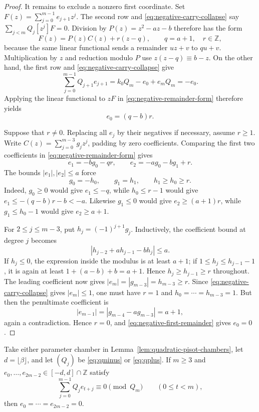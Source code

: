 \begin{proof}
It remains to exclude a nonzero first coordinate.  Set
$F(z)=\sum_{j=0}^{m-1}e_{j+1}z^j$.  The second row and
\eqref{eq:negative-carry-collapse} say
$\sum_{j<m}Q_j[z^j]F=0$.  Division by
$P(z)=z^2-az-b$ therefore has the form
\begin{equation}
F(z)=P(z)C(z)+r(z-q),
\qquad q=a+1,\quad r\in\mathbb Z,
\label{eq:negative-remainder-form}
\end{equation}
because the same linear functional sends a remainder $uz+v$ to $qu+v$.
Multiplication by $z$ and reduction modulo $P$ use
$z(z-q)\equiv b-z$.  On the other hand, the first row and
\eqref{eq:negative-carry-collapse} give
\[
\sum_{j=0}^{m-1}Q_{j+1}e_{j+1}
=k_0Q_m-e_0+e_mQ_m=-e_0.
\]
Applying the linear functional to $zF$ in
\eqref{eq:negative-remainder-form} therefore yields
\begin{equation}
e_0=(q-b)r.
\label{eq:negative-first-remainder}
\end{equation}

Suppose that $r\ne0$.  Replacing all $e_j$ by their negatives if necessary,
assume $r\ge1$.  Write
$C(z)=\sum_{j=0}^{m-3}g_jz^j$, padding by zero coefficients.  Comparing the
first two coefficients in \eqref{eq:negative-remainder-form} gives
\[
e_1=-bg_0-qr,
\qquad
e_2=-ag_0-bg_1+r.
\]
The bounds $|e_1|,|e_2|\le a$ force
\[
g_0=-h_0,
\qquad g_1=h_1,
\qquad h_1\ge h_0\ge r.
\]
Indeed, $g_0\ge0$ would give $e_1\le-q$, while
$h_0\le r-1$ would give
$e_1\le-(q-b)r-b<-a$.  Likewise $g_1\le0$ would give
$e_2\ge(a+1)r$, while $g_1\le h_0-1$ would give $e_2\ge a+1$.

For $2\le j\le m-3$, put $h_j=(-1)^{j+1}g_j$.  Inductively, the coefficient
bound at degree $j$ becomes
\[
|h_{j-2}+ah_{j-1}-bh_j|\le a.
\]
If $h_j\le0$, the expression inside the modulus is at least $a+1$; if
$1\le h_j\le h_{j-1}-1$, it is again at least
$1+(a-b)+b=a+1$.  Hence
$h_j\ge h_{j-1}\ge r$ throughout.  The leading coefficient now gives
$|e_m|=|g_{m-3}|=h_{m-3}\ge r$.  Since
\eqref{eq:negative-carry-collapse} gives $|e_m|\le1$, one must have
$r=1$ and $h_0=\cdots=h_{m-3}=1$.  But then the penultimate coefficient is
\[
|e_{m-1}|=|g_{m-4}-ag_{m-3}|=a+1,
\]
again a contradiction.  Hence $r=0$, and
\eqref{eq:negative-first-remainder} gives $e_0=0$.
\end{proof}

\begin{lemma}
\label{lem:quadratic-sliding-congruences}
Take either parameter chamber in
Lemma~\ref{lem:quadratic-pisot-chambers}, let $d=\lfloor\beta\rfloor$, and
let $(Q_j)$ be \eqref{eq:qminus} or \eqref{eq:qplus}.  If $m\ge3$ and
$e_0,\ldots,e_{2m-2}\in[-d,d]\cap\mathbb Z$ satisfy
\begin{equation}
\sum_{j=0}^{m-1}Q_j e_{t+j}\equiv0\pmod{Q_m}
\qquad(0\le t<m),
\label{eq:sliding-kernel}
\end{equation}
then $e_0=\cdots=e_{2m-2}=0$.
\end{lemma}

